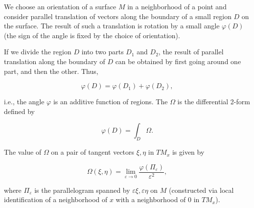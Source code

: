 We choose an orientation of a surface $M$ in a neighborhood of a point and consider parallel translation of vectors along the boundary of a small region $D$ on the surface. The result of such a translation is rotation by a small angle $\varphi(D)$ (the sign of the angle is fixed by the choice of orientation).

If we divide the region $D$ into two parts $D_1$ and $D_2$, the result of parallel translation along the boundary of $D$ can be obtained by first going around one part, and then the other. Thus,

$$\varphi(D) = \varphi(D_1) + \varphi(D_2),$$

i.e., the angle $\varphi$ is an additive function of regions. The  $\Omega$ is the differential 2-form defined by

$$\varphi(D) = \int_D \Omega.$$

The value of $\Omega$ on a pair of tangent vectors $\xi, \eta$ in $TM_x$ is given by

$$\Omega(\xi, \eta) = \lim_{\varepsilon \to 0} \frac{\varphi(\Pi_\varepsilon)}{\varepsilon^2},$$

where $\Pi_\varepsilon$ is the parallelogram spanned by $\varepsilon\xi, \varepsilon\eta$ on $M$ (constructed via local identification of a neighborhood of $x$ with a neighborhood of $0$ in $TM_x$).
